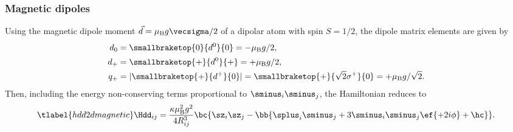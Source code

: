 \subsubsection{Magnetic dipoles}
Using the magnetic dipole moment $\vec{d}=\mu_\text{B} g \vecsigma / 2$ of a dipolar atom with spin $S=1/2$,
the dipole matrix elements are given by
\begin{align}
    d_0 &= \smallbraketop{0}{d^0}{0} = -\mu_\text{B}g/2, \vphantom{\sqrt{2}} \\
    d_+ &= \smallbraketop{+}{d^0}{+} = +\mu_\text{B}g/2, \vphantom{\sqrt{2}} \\
    q_+ &= |\smallbraketop{+}{d^+}{0}| = \smallbraketop{+}{\sqrt{2} \sigma^+}{0} = +\mu_\text{B}g/\sqrt{2}.
\end{align}
Then, including the energy non-conserving terms proportional to $\sminus_i\sminus_j$, the Hamiltonian reduces to
\begin{align} \tlabel{hdd2dmagnetic}
    \Hdd_{ij} = \frac{\kappa \mu_\text{B}^2 g^2}{4 R_{ij}^3} \bc{ \sz_i \sz_j - \bb{\splus_i \sminus_j+ 3 \sminus_i\sminus_j \ef{+2i\phi} + \hc } }.
\end{align}

